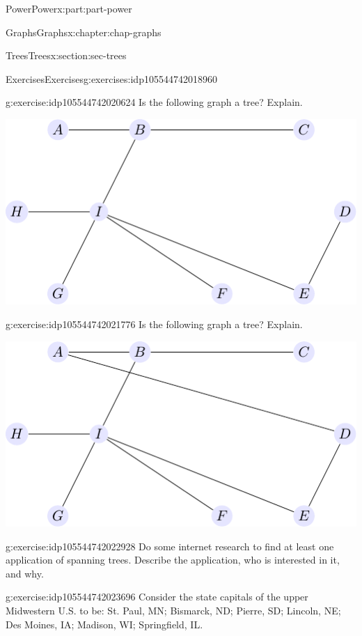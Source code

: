 \documentclass[oneside,10pt,]{book}
\numberwithin{equation}{section}
\begin{document}
\begin{partptx}{Power}{}{Power}{}{}{x:part:part-power}
\begin{chapterptx}{Graphs}{}{Graphs}{}{}{x:chapter:chap-graphs}
\begin{sectionptx}{Trees}{}{Trees}{}{}{x:section:sec-trees}
\begin{exercises-subsection-numberless}{Exercises}{}{Exercises}{}{}{g:exercises:idp105544742018960}
\begin{divisionexercise}{2}{}{}{g:exercise:idp105544742020624}
Is the following graph a tree? Explain.%
\begin{image}{0.3}{0.4}{0.3}%
\includegraphics[width=\linewidth]{./images/tree-exer02.pdf}
\end{image}%
\end{divisionexercise}%
\begin{divisionexercise}{3}{}{}{g:exercise:idp105544742021776}%
Is the following graph a tree? Explain.%
\begin{image}{0.3}{0.4}{0.3}%
\includegraphics[width=\linewidth]{./images/tree-exer03.pdf}
\end{image}%
\end{divisionexercise}%
\begin{divisionexercise}{4}{}{}{g:exercise:idp105544742022928}%
Do some internet research to find at least one application of spanning trees. Describe the application, who is interested in it, and why.%
\end{divisionexercise}%
\begin{divisionexercise}{5}{}{}{g:exercise:idp105544742023696}%
Consider the state capitals of the upper Midwestern U.S. to be: St. Paul, MN; Bismarck, ND; Pierre, SD; Lincoln, NE; Des Moines, IA; Madison, WI; Springfield, IL.%

\end{divisionexercise}
\end{exercises-subsection-numberless}
\end{sectionptx}
\end{chapterptx}
\end{partptx}
\end{document}
